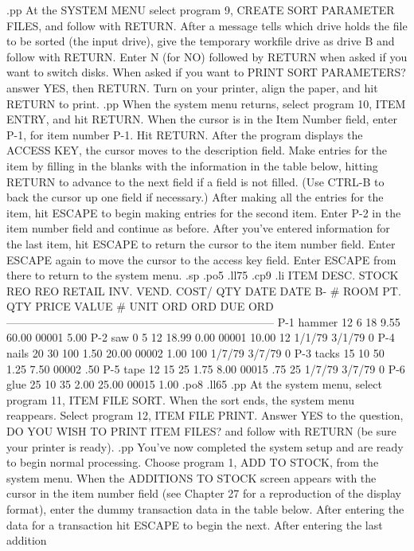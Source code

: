 .pp
At the SYSTEM MENU select program 9, CREATE SORT PARAMETER FILES, and
follow with RETURN.  After a message tells which drive holds the file
to be sorted (the input drive), give the temporary workfile drive as
drive B and follow with RETURN.  Enter N (for NO) followed by RETURN
when asked if you want to switch disks.  When asked if you want to PRINT
SORT PARAMETERS? answer YES, then RETURN.
Turn on your printer, align the paper, and
hit RETURN to print.
.pp
When the system menu returns, select program 10, ITEM ENTRY, and hit RETURN.
When the cursor is in the Item Number field, enter P-1, for item number P-1.
Hit RETURN.  After the program displays the ACCESS KEY, the cursor
moves to the description field.  Make entries for the item by filling in
the blanks with the information in the table below, hitting RETURN to advance
to the next field if a field is not filled. (Use CTRL-B to back the cursor
up one field if necessary.)  After making all the entries for the item, hit
ESCAPE to begin making entries for the second item.  Enter P-2 in the item
number field and continue as before.  After you've entered information
for the last item, hit ESCAPE to return the cursor to the item number field.
Enter ESCAPE again to move the cursor to the access key field.	Enter
ESCAPE from there to return to the system menu.
.sp
.po5
.ll75
.cp9
.li
ITEM DESC.  STOCK REO REO RETAIL INV.  VEND. COST/ QTY DATE   DATE   B-
 #	    ROOM  PT. QTY  PRICE VALUE	 #   UNIT  ORD ORD    DUE    ORD
------------------------------------------------------------------------
P-1  hammer  12    6   18   9.55 60.00 00001  5.00
P-2  saw      0    5   12  18.99  0.00 00001 10.00  12 1/1/79 3/1/79  0
P-4  nails   20   30  100   1.50 20.00 00002  1.00 100 1/7/79 3/7/79  0
P-3  tacks   15   10   50   1.25  7.50 00002   .50
P-5  tape    12   15   25   1.75  8.00 00015   .75  25 1/7/79 3/7/79  0
P-6  glue    25   10   35   2.00 25.00 00015  1.00
.po8
.ll65
.pp
At the system menu, select program 11, ITEM FILE SORT.
When the sort ends, the system menu reappears.
Select program 12, ITEM FILE PRINT.  Answer YES to the question,
DO YOU WISH TO PRINT ITEM FILES?  and follow with RETURN (be sure
your printer is ready).
.pp
You've now completed the system setup and are ready to begin normal processing.
Choose program 1, ADD TO STOCK, from the system menu.  When the
ADDITIONS TO STOCK screen appears with the cursor in the item number
field (see Chapter 27 for a reproduction of the display format), enter
the dummy transaction data in the table below.
After entering the data for a
transaction hit ESCAPE to begin the next.  After entering the last addition
